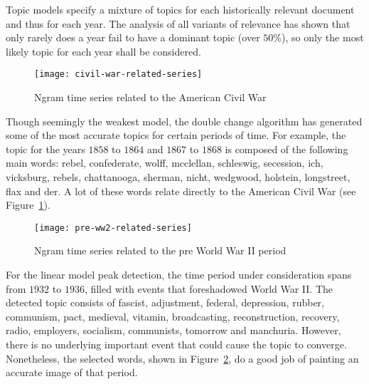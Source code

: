 
Topic models specify a mixture of topics for each historically relevant document and thus for each year. The analysis of all variants of relevance has shown that only rarely does a year fail to have a dominant topic (over $50 \%$), so only the most likely topic for each year shall be considered.

\begin{figure}[t]
\centering
\texttt{[image: civil-war-related-series]}
\caption{Ngram time series related to the American Civil War}
\label{fig:civil-war-related-series}
\end{figure}

Though seemingly the weakest model, the double change algorithm has generated some of the most accurate topics for certain periods of time. For example, the topic for the years $1858$ to $1864$ and $1867$ to $1868$ is composed of the following main words: rebel, confederate, wolff, mcclellan, schleswig, secession, ich, vicksburg, rebels, chattanooga, sherman, nicht, wedgwood, holstein, longstreet, flax and der. A lot of these words relate directly to the American Civil War (see Figure~\ref{fig:civil-war-related-series}).

\begin{figure}[t]
\centering
\texttt{[image: pre-ww2-related-series]}
\caption{Ngram time series related to the pre World War II period}
\label{fig:pre-ww2-related-series}
\end{figure}

For the linear model peak detection, the time period under consideration spans from $1932$ to $1936$, filled with events that foreshadowed World War II. The detected topic consists of fascist, adjustment, federal, depression, rubber, communism, pact, medieval, vitamin, broadcasting, reconstruction, recovery, radio, employers, socialism, communists, tomorrow and manchuria. However, there is no underlying important event that could cause the topic to converge. Nonetheless, the selected words, shown in Figure~\ref{fig:pre-ww2-related-series}, do a good job of painting an accurate image of that period.

